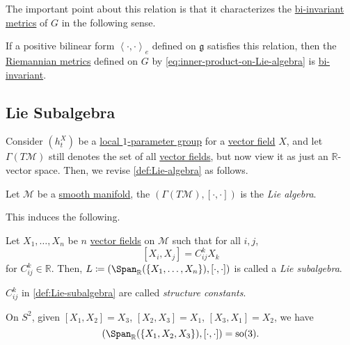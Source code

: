 The important point about this relation is that it characterizes the \hyperref[def:Riemannian-metric-left-invariant]{bi-invariant} \hyperref[def:Riemannian-metric]{metrics} of \(G\) in the following sense.

\begin{remark}
	If a positive bilinear form \(\left\langle \cdot, \cdot \right\rangle _e \) defined on \(\mathfrak{g} \) satisfies this relation, then the \hyperref[def:Riemannian-metric]{Riemannian metrics} defined on \(G\) by \autoref{eq:inner-product-on-Lie-algebra} is \hyperref[def:Riemannian-metric-left-invariant]{bi-invariant}.
\end{remark}

\subsection{Lie Subalgebra}
Consider \((h^X_t)\) be a \hyperref[def:local-1-parameter-group]{local \(1\)-parameter group} for a \hyperref[def:vector-field]{vector field} \(X\), and let \(\Gamma (T\mathcal{M} )\) still denotes the set of all \hyperref[def:vector-field]{vector fields}, but now view it as just an \(\mathbb{R} \)-vector space. Then, we revise \autoref{def:Lie-algebra} as follows.

\begin{definition}\label{def:Lie-algebra*}
	Let \(\mathcal{M} \) be a \hyperref[def:smooth-manifold]{smooth manifold}, the \((\Gamma (T\mathcal{M} ), [\cdot, \cdot])\) is the \emph{Lie algebra}.
\end{definition}

This induces the following.

\begin{definition}\label{def:Lie-subalgebra}
	Let \(X_1, \dots , X_n\) be \(n\) \hyperref[def:vector-field]{vector fields} on \(\mathcal{M} \) such that for all \(i, j\),
	\[
		[X_i, X_j] = C^k_{ij} X_k
	\]
	for \(C^k_{ij}\in \mathbb{R}  \). Then, \(L\coloneqq (\Span_\mathbb{R} (\left\{ X_1, \dots , X_n \right\} ), [\cdot, \cdot] )\) is called a \emph{Lie subalgebra}.
\end{definition}

\begin{notation}\label{not:structure-constant}
	\(C^k_{ij} \) in \autoref{def:Lie-subalgebra} are called \emph{structure constants}.
\end{notation}

\begin{eg}
	On \(S^2\), given \([X_1, X_2] = X_3\), \([X_2, X_3] = X_1\), \([X_3, X_1] = X_2\), we have
	\[
		\left( \Span_{\mathbb{R} }(\left\{ X_1, X_2, X_3 \right\} ), [\cdot, \cdot] \right) = \mathrm{so}(3).
	\]
\end{eg}

